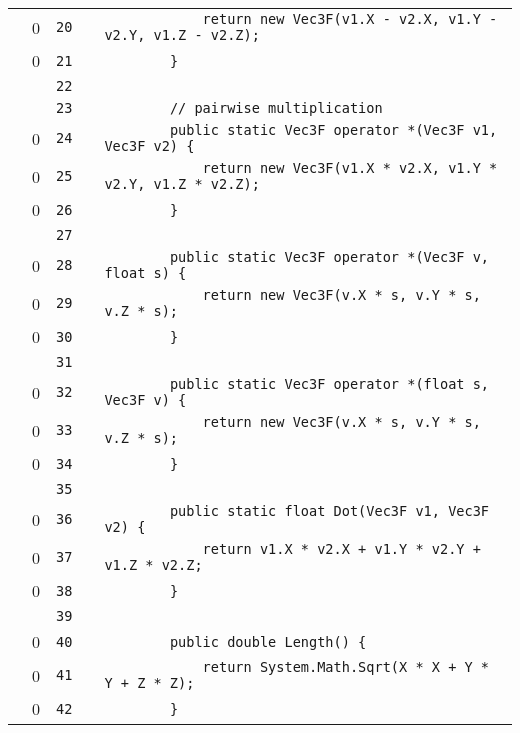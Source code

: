\documentclass[a4paper,landscape,10pt]{article}
\begin{document}
\begin{longtable}[l]{lrrll}
\cellcolor{red} & 0 & \verb~20~ & & \verb~            return new Vec3F(v1.X - v2.X, v1.Y - v2.Y, v1.Z - v2.Z);~\\
\cellcolor{red} & 0 & \verb~21~ & & \verb~        }~\\
\cellcolor{gray} &  & \verb~22~ & & \verb~~\\
\cellcolor{gray} &  & \verb~23~ & & \verb~        // pairwise multiplication~\\
\cellcolor{red} & 0 & \verb~24~ & & \verb~        public static Vec3F operator *(Vec3F v1, Vec3F v2) {~\\
\cellcolor{red} & 0 & \verb~25~ & & \verb~            return new Vec3F(v1.X * v2.X, v1.Y * v2.Y, v1.Z * v2.Z);~\\
\cellcolor{red} & 0 & \verb~26~ & & \verb~        }~\\
\cellcolor{gray} &  & \verb~27~ & & \verb~~\\
\cellcolor{red} & 0 & \verb~28~ & & \verb~        public static Vec3F operator *(Vec3F v, float s) {~\\
\cellcolor{red} & 0 & \verb~29~ & & \verb~            return new Vec3F(v.X * s, v.Y * s, v.Z * s);~\\
\cellcolor{red} & 0 & \verb~30~ & & \verb~        }~\\
\cellcolor{gray} &  & \verb~31~ & & \verb~~\\
\cellcolor{red} & 0 & \verb~32~ & & \verb~        public static Vec3F operator *(float s, Vec3F v) {~\\
\cellcolor{red} & 0 & \verb~33~ & & \verb~            return new Vec3F(v.X * s, v.Y * s, v.Z * s);~\\
\cellcolor{red} & 0 & \verb~34~ & & \verb~        }~\\
\cellcolor{gray} &  & \verb~35~ & & \verb~~\\
\cellcolor{red} & 0 & \verb~36~ & & \verb~        public static float Dot(Vec3F v1, Vec3F v2) {~\\
\cellcolor{red} & 0 & \verb~37~ & & \verb~            return v1.X * v2.X + v1.Y * v2.Y + v1.Z * v2.Z;~\\
\cellcolor{red} & 0 & \verb~38~ & & \verb~        }~\\
\cellcolor{gray} &  & \verb~39~ & & \verb~~\\
\cellcolor{red} & 0 & \verb~40~ & & \verb~        public double Length() {~\\
\cellcolor{red} & 0 & \verb~41~ & & \verb~            return System.Math.Sqrt(X * X + Y * Y + Z * Z);~\\
\cellcolor{red} & 0 & \verb~42~ & & \verb~        }~\\

\end{longtable}
\end{document}
